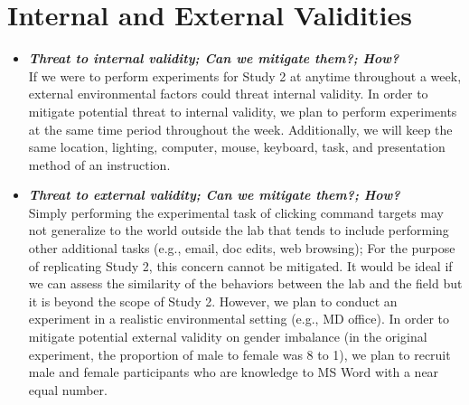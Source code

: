 \documentclass{article}
\begin{document}
\section*{Internal and External Validities}  
\begin{itemize}
   \item \textbf{\textit{Threat to internal validity; Can we mitigate them?; How?}} \\
   If we were to perform experiments for Study 2 at anytime throughout a week, external environmental factors could threat internal validity. In order to mitigate potential threat to internal validity, we plan to perform experiments at the same time period throughout the week. Additionally, we will keep the same location, lighting, computer, mouse, keyboard, task, and presentation method of an instruction. 
   \item \textbf{\textit{Threat to external validity; Can we mitigate them?; How?}} \\
   Simply performing the experimental task of clicking command targets may not generalize to the world outside the lab that tends to include performing other additional tasks (e.g., email, doc edits, web browsing); For the purpose of replicating Study 2, this concern cannot be mitigated. It would be ideal if we can assess the similarity of the behaviors between the lab and the field but it is beyond the scope of Study 2.  However, we plan to conduct an experiment in a realistic environmental setting (e.g., MD office). In order to mitigate potential external validity on gender imbalance (in the original experiment, the proportion of male to female was 8 to 1), we plan to recruit male and female participants who are knowledge to MS Word with a near equal number. 
   \end{itemize} 
\pagebreak
\end{document}
